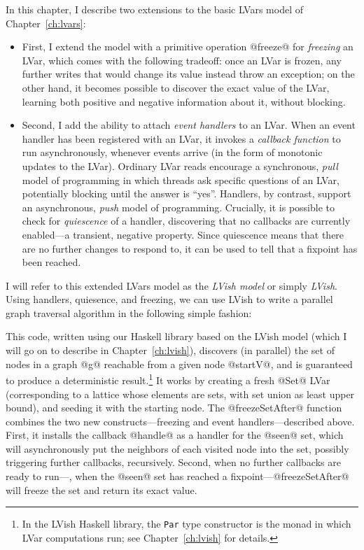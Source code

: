 In this chapter, I describe two extensions to the basic LVars model of
Chapter~\ref{ch:lvars}:

\begin{itemize}
\item First, I extend the model with a primitive operation @freeze@
  for \emph{freezing} an LVar, which comes with the following
  tradeoff: once an LVar is frozen, any further writes that would
  change its value instead throw an exception; on the other hand, it
  becomes possible to discover the exact value of the LVar, learning
  both positive and negative information about it, without blocking.
\item
  Second, I add the ability to attach \emph{event handlers} to an
  LVar.  When an event handler has been registered with an LVar, it
  invokes a \emph{callback function} to run asynchronously, whenever
  events arrive (in the form of monotonic updates to the LVar).
  Ordinary LVar reads encourage a synchronous, \emph{pull} model of
  programming in which threads ask specific questions of an LVar,
  potentially blocking until the answer is ``yes''.  Handlers, by
  contrast, support an asynchronous, \emph{push} model of programming.
  Crucially, it is possible to check for \emph{quiescence} of a
  handler, discovering that no callbacks are currently enabled---a
  transient, negative property.  Since quiescence means that there are
  no further changes to respond to, it can be used to tell that a
  fixpoint has been reached.
\end{itemize}

I will refer to this extended LVars model as the \emph{LVish model} or
simply \emph{LVish}.  Using handlers, quiesence, and freezing, we can
use LVish to write a parallel graph traversal algorithm in the
following simple fashion:



This code, written using our Haskell library based on the LVish model
(which I will go on to describe in Chapter~\ref{ch:lvish}), discovers
(in parallel) the set of nodes in a graph @g@ reachable from a given
node @startV@, and is guaranteed to produce a deterministic
result.\footnote{In the LVish Haskell library, the \lstinline|Par|
  type constructor is the monad in which LVar computations run; see
  Chapter~\ref{ch:lvish} for details.}  It works by creating a fresh
@Set@ LVar (corresponding to a lattice whose elements are sets, with
set union as least upper bound), and seeding it with the starting
node.  The @freezeSetAfter@ function combines the two new
constructs---freezing and event handlers---described above.  First, it
installs the callback @handle@ as a handler for the @seen@ set, which
will asynchronously put the neighbors of each visited node into the
set, possibly triggering further callbacks, recursively.  Second, when
no further callbacks are ready to run---\ie, when the @seen@ set has
reached a fixpoint---@freezeSetAfter@ will freeze the set and return
its exact value.

